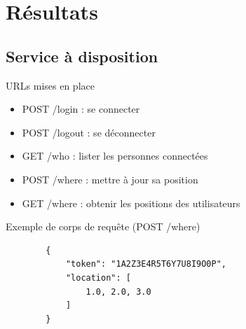 \documentclass{beamer} %
\begin{document}
  \section{Résultats}
  \subsection{Service à disposition}
  \begin{frame}[fragile]{\subsecname}

    \begin{block}{URLs mises en place}
      \begin{itemize}
        \item POST /login : se connecter
        \item POST /logout : se déconnecter
        \item GET /who : lister les personnes connectées
        \item POST /where : mettre à jour sa position
        \item GET /where : obtenir les positions des utilisateurs
      \end{itemize}
    \end{block}

    \pause

    \begin{exampleblock}{Exemple de corps de requête (POST /where)}
      \begin{verbatim}
        {
            "token": "1A2Z3E4R5T6Y7U8I9O0P",
            "location": [
                1.0, 2.0, 3.0
            ]
        }
      \end{verbatim}
    \end{exampleblock}

\end{frame}
\end{document}
